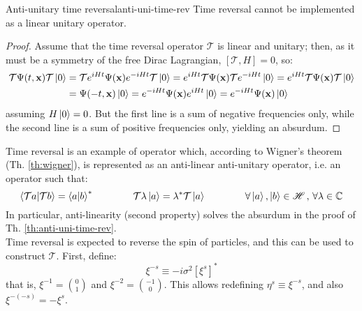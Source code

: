 \begin{theorem}{Anti-unitary time reversal}{anti-uni-time-rev}
  Time reversal cannot be implemented as a linear unitary operator.

  \tcblower

  \begin{proof}
    Assume that the time reversal operator $ \mathcal{T} $ is linear and unitary; then, as it must be a symmetry of the free Dirac Lagrangian, $ [\mathcal{T} , H] = 0 $, so:
    \begin{equation*}
      \begin{split}
        \mathcal{T} \Psi(t,\mathbf{x}) \mathcal{T} \ket{0}
        &= \mathcal{T} e^{i H t} \Psi(\mathbf{x}) e^{-i H t} \mathcal{T} \ket{0} = e^{i H t} \mathcal{T} \Psi(\mathbf{x}) \mathcal{T} e^{-i H t} \ket{0} = e^{i H t} \mathcal{T} \Psi(\mathbf{x}) \mathcal{T} \ket{0} \\
        &= \Psi(-t,\mathbf{x}) \ket{0} = e^{-i H t} \Psi(\mathbf{x}) e^{i H t} \ket{0} = e^{-i H t} \Psi(\mathbf{x}) \ket{0}
      \end{split}
    \end{equation*}
    assuming $ H \ket{0} = 0 $. But the first line is a sum of negative frequencies only, while the second line is a sum of positive frequencies only, yielding an absurdum.
  \end{proof}
\end{theorem}

Time reversal is an example of operator which, according to Wigner's theorem (Th. \ref{th:wigner}), is represented as an anti-linear anti-unitary operator, i.e. an operator such that:
\begin{equation*}
  \braket{\mathcal{T} a | \mathcal{T} b} = \braket{a | b}^*
  \qquad \qquad
  \mathcal{T} \lambda \ket{a} = \lambda^* \mathcal{T} \ket{a}
  \qquad \qquad
  \forall \ket{a},\ket{b} \in \mathscr{H}\,,\,\forall \lambda \in \mathbb{C}
\end{equation*}
In particular, anti-linearity (second property) solves the absurdum in the proof of Th. \ref{th:anti-uni-time-rev}.\\
Time reversal is expected to reverse the spin of particles, and this can be used to construct $ \mathcal{T} $. First, define:
\begin{equation}
  \xi^{-s} \equiv -i \sigma^2 [\xi^s]^*
  \label{eq:2.37}
\end{equation}
that is, $ \xi^{-1} = \binom{0}{1} $ and $ \xi^{-2} = \binom{-1}{0} $. This allows redefining $ \eta^s \equiv \xi^{-s} $, and also $ \xi^{-(-s)} = - \xi^s $.

